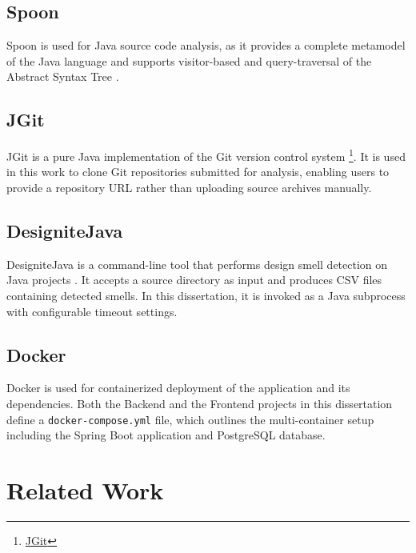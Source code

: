 \subsection{Spoon}
\label{subsec:spoon}

\indent \par Spoon is used for Java source code analysis, as it provides a complete metamodel of the Java language and supports visitor-based and query-traversal of the Abstract Syntax Tree \cite{Pawlak2016}.

\subsection{JGit}
\label{subsec:jgit}

\indent \par JGit is a pure Java implementation of the Git version control system \footnote{\href{https://www.eclipse.org/jgit/}{JGit}}. It is used in this work to clone Git repositories submitted for analysis, enabling users to provide a repository URL rather than uploading source archives manually.

\subsection{DesigniteJava}
\label{subsec:designite-java}

\indent \par DesigniteJava is a command-line tool that performs design smell detection on Java projects \cite{Sharma2018}. It accepts a source directory as input and produces CSV files containing detected smells. In this dissertation, it is invoked as a Java subprocess with configurable timeout settings.

\subsection{Docker}
\label{subsec:docker}

\indent \par Docker is used for containerized deployment of the application and its dependencies. Both the Backend and the Frontend projects in this dissertation define a \texttt{docker-compose.yml} file, which outlines the multi-container setup including the Spring Boot application and PostgreSQL database.

\section{Related Work}
\label{sec:related-work}

